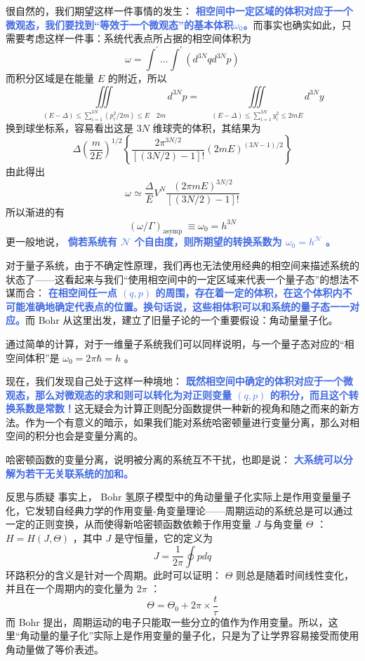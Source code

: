 很自然的，我们期望这样一件事情的发生： \textcolor{RoyalBlue}{\textbf{\kaishu 相空间中一定区域的体积对应于一个微观态，我们要找到“等效于一个微观态”的基本体积$\omega_0$。}}而事实也确实如此，只需要考虑这样一件事：系统代表点所占据的相空间体积为
\begin{equation}
    \omega=\int^{\prime} \ldots \int^{\prime}\left(d^{3 N} q d^{3 N} p\right)
\end{equation}
而积分区域是在能量 $E$ 的附近，所以
\[
    \iiint\limits_{(E-\Delta) \leq \sum_{i=1}^{3 N}\left(p_i^2 / 2 m\right) \leq E \quad 2 m} d^{3 N} p=\quad \iiint\limits_{(E-\Delta) \leq \sum_{i=1}^{3 N} y_i^2 \leq 2 m E
    } d^{3 N} y
\]
换到球坐标系，容易看出这是 $3N$ 维球壳的体积，其结果为
\[
    \Delta\left(\frac{m}{2 E}\right)^{1 / 2}\left\{\frac{2 \pi^{3 N / 2}}{[(3 N / 2)-1] !}(2 m E)^{(3 N-1) / 2}\right\}
\]
由此得出
\[
    \omega \simeq \frac{\Delta}{E} V^N \frac{(2 \pi m E)^{3 N / 2}}{[(3 N / 2)-1] !}
\]
所以渐进的有
\begin{equation}
    (\omega / \Gamma)_{\text {asymp }} \equiv \omega_0=h^{3 N}
\end{equation}
更一般地说， \textcolor{RoyalBlue}{\textbf{\kaishu 倘若系统有 $\mathcal{N}$ 个自由度，则所期望的转换系数为 $\omega_0 = h^{\mathcal{N}}$ 。}}

对于量子系统，由于不确定性原理，我们再也无法使用经典的相空间来描述系统的状态了——这看起来与我们“使用相空间中的一定区域来代表一个量子态”的想法不谋而合： \textcolor{RoyalBlue}{\textbf{\kaishu  在相空间任一点 $(q,p)$ 的周围，存在着一定的体积，在这个体积内不可能准确地确定代表点的位置。换句话说，这些相体积可以和系统的量子态一一对应。}}而 Bohr 从这里出发，建立了旧量子论的一个重要假设：角动量量子化。

通过简单的计算，对于一维量子系统我们可以同样说明，与一个量子态对应的“相空间体积”是 $\omega_0 = 2\pi \hbar = h$ 。

现在，我们发现自己处于这样一种境地： \textcolor{RoyalBlue}{\textbf{\kaishu 既然相空间中确定的体积对应于一个微观态，那么对微观态的求和则可以转化为对正则变量 $(q,p)$ 的积分，而且这个转换系数是常数！}}这无疑会为计算正则配分函数提供一种新的视角和随之而来的新方法。作为一个有意义的暗示，如果我们能对系统哈密顿量进行变量分离，那么对相空间的积分也会是变量分离的。

哈密顿函数的变量分离，说明被分离的系统互不干扰，也即是说： \textcolor{RoyalBlue}{\textbf{\kaishu 大系统可以分解为若干无关联系统的加和。}} 

\begin{justification}{\kaishu 反思与质疑}
    \kaishu \fontsize{11pt}{16pt}
    \quad\quad 事实上， Bohr 氢原子模型中的角动量量子化实际上是作用变量量子化，它发轫自经典力学的作用变量-角变量理论——周期运动的系统总是可以通过一定的正则变换，从而使得新哈密顿函数依赖于作用变量 $J$ 与角变量 $\Theta$ ：$H = H(J,\Theta)$ ，其中 $J$ 是守恒量，它的定义为
    \[
        J = \frac{1}{2\pi} \oint pdq
    \]
    环路积分的含义是针对一个周期。此时可以证明： $\Theta$ 则总是随着时间线性变化，并且在一个周期内的变化量为 $2\pi$ ：
    \[
        \Theta = \Theta_0 + 2\pi \times \frac{t}{\tau} 
    \]
    而 Bohr 提出，周期运动的电子只能取一些分立的值作为作用变量。所以，这里“角动量的量子化”实际上是作用变量的量子化，只是为了让学界容易接受而使用角动量做了等价表述。
\end{justification}    

